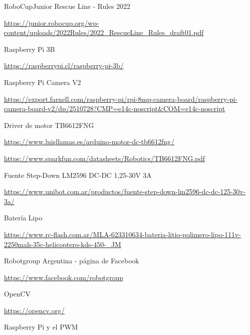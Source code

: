 \documentclass[11pt,a4paper]{article}
\begin{document}
	\newpage
	\begin{thebibliography}{}
		 RoboCupJunior Rescue Line - Rules 2022
		
		\href{https://junior.robocup.org/wp-content/uploads/2022Rules/2022_RescueLine_Rules_draft01.pdf}{https://junior.robocup.org/wp-content/uploads/2022Rules/2022\_RescueLine\_Rules\_draft01.pdf}
		
		 Raspberry Pi 3B
		
		\href{https://raspberrypi.cl/raspberry-pi-3b/}{https://raspberrypi.cl/raspberry-pi-3b/}
		
		 Raspberry Pi Camera V2
		
		\href{https://export.farnell.com/raspberry-pi/rpi-8mp-camera-board/raspberry-pi-camera-board-v2/dp/2510728?CMP=e14c-noscript&COM=e14c-noscript}{https://export.farnell.com/raspberry-pi/rpi-8mp-camera-board/raspberry-pi-camera-board-v2/dp/2510728?CMP=e14c-noscript\&COM=e14c-noscript}
		
		 Driver de motor TB6612FNG
		
		\href{https://www.luisllamas.es/arduino-motor-dc-tb6612fng/}{https://www.luisllamas.es/arduino-motor-dc-tb6612fng/}
		
		\href{https://www.sparkfun.com/datasheets/Robotics/TB6612FNG.pdf}{https://www.sparkfun.com/datasheets/Robotics/TB6612FNG.pdf}
		
		 Fuente Step-Down LM2596 DC-DC 1,25-30V 3A
		
		\href{https://www.unibot.com.ar/productos/fuente-step-down-lm2596-dc-dc-125-30v-3a/}{https://www.unibot.com.ar/productos/fuente-step-down-lm2596-dc-dc-125-30v-3a/}
		
		 Batería Lipo
		
		\href{https://www.rc-flash.com.ar/MLA-623310634-bateria-litio-polimero-lipo-111v-2250mah-35c-helicoptero-kds-450-_JM}{https://www.rc-flash.com.ar/MLA-623310634-bateria-litio-polimero-lipo-111v-2250mah-35c-helicoptero-kds-450-\_JM}
		
		 Robotgroup Argentina - página de Facebook
		
		\href{https://www.facebook.com/robotgroup}{https://www.facebook.com/robotgroup}
		
		 OpenCV
		
		\href{https://opencv.org/}{https://opencv.org/}
		
		 Raspberry Pi y el PWM
		

\end{thebibliography}
\end{document}
